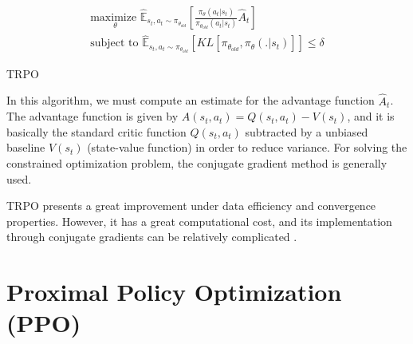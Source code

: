 
\begin{align}
\underset{\theta}{\textrm{maximize }} \mathbb{\hat{E}}_{s_t,a_t \sim \pi_{\theta_{old}} } \left[ \frac{\pi_{\theta}(a_t|s_t)}{
\pi_{\theta_{old}}(a_t|s_t)}\hat{A}_t \right]
\label{eq:TRPO_1}
\\
\textrm{subject to } \mathbb{\hat{E}}_{s_t,a_t \sim \pi_{\theta_{old}} } \left[ KL[\pi_{\theta_{old}},\pi_{\theta}(.|s_t)] \right] \leq \delta
\label{eq:TRPO_2}
\end{align}

\begin{algorithm}[H]
    \DontPrintSemicolon
    \SetAlgoLined
    \Return{$\pi_{\theta}$}
    \caption{TRPO}
    \label{algo:TRPO}
\end{algorithm}

In this algorithm, we must compute an estimate for the advantage function $\hat{A}_t$. The advantage function is given by $A(s_t,a_t) = Q(s_t,a_t) - V(s_t)$, and it is basically the standard critic function $Q(s_t,a_t)$ subtracted by a unbiased baseline $V(s_t)$ (state-value function) in order to reduce variance. For solving the constrained optimization problem, the conjugate gradient method is generally used.

TRPO presents a great improvement under data efficiency and convergence properties. However, it has a great computational cost, and its implementation through conjugate gradients can be relatively complicated \cite{PPO}.

\section{Proximal Policy Optimization (PPO)}



